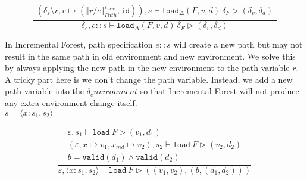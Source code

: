 \documentclass[10pt,twoside,a4paper]{article}
\theoremstyle{theorem}
\theoremstyle{lemma}
\theoremstyle{property}
\theoremstyle{definition}
\theoremstyle{assumption}
\def\id{\mathtt{id}}
\begin{document}
\begin{displaymath}
	\frac{\begin{array}{c}
		(\delta_\varepsilon \setminus r, r \mapsto (\llbracket r/e \rrbracket^{\varepsilon_{new}}_{Path},\id)) , s \vdash \mathtt{load}_\Delta (F,v,d)~ \delta_F \rhd (\delta_v,\delta_d)
	\end{array}}
	{
		\delta_\varepsilon, e::s \vdash \mathtt{load}_\Delta (F,v,d)~ \delta_F \rhd (\delta_v,\delta_d)
	}
\end{displaymath}

In Incremental Forest, path specification $e\!::\!s$ will create a new path but may not result in the same path in old environment and new environment. 
We solve this by always applying the new path in the new environment to the path variable $r$. A tricky part here is we don't change the path variable. Instead, we add a new path variable into the $\delta_environment$ so that Incremental Forest will not produce any extra environment change itself.\\

$\boxed{s = \langle x : s_1, s_2 \rangle}$

\begin{displaymath}
	\frac{\begin{array}{c}
		\varepsilon, s_1 \vdash \mathtt{load}~F \rhd (v_1,d_1)\\
		(\varepsilon, x \mapsto v_1, x_{md} \mapsto v_2), s_2 \vdash \mathtt{load}~F \rhd (v_2,d_2)\\
		b = \mathtt{valid}(d_1) \land \mathtt{valid}(d_2)
	\end{array}}
	{\varepsilon, \langle x : s_1, s_2 \rangle \vdash \mathtt{load}~F \rhd ((v_1, v_2),(b,(d_1,d_2))) }
\end{displaymath}
\end{document}
